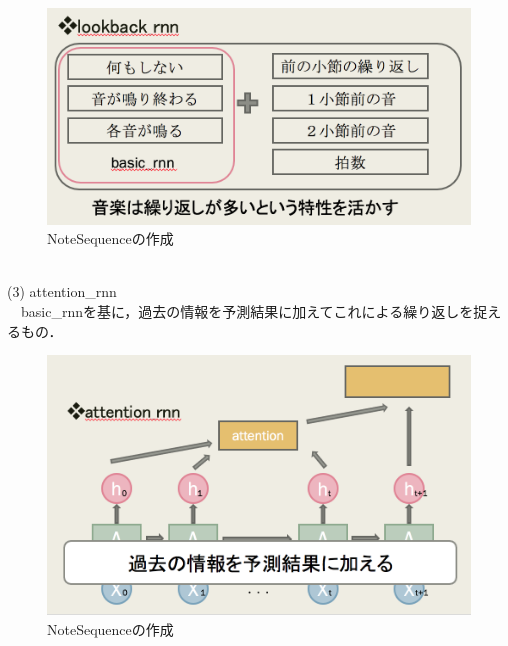 \begin{figure}[!ht]
    \begin{screen}
    \begin{center}
        \includegraphics[scale=0.8, clip]{./img/lookback1.png}
        \caption{NoteSequenceの作成}
        \label{fig:NoteSequenceの作成}
    \end{center}
    \end{screen}
\end{figure} \\
(3) attention\_rnn\\
　basic\_rnnを基に，過去の情報を予測結果に加えてこれによる繰り返しを捉えるもの．\\
\begin{figure}[!ht]
    \begin{screen}
    \begin{center}
        \includegraphics[scale=0.8, clip]{./img/attention1.png}
        \caption{NoteSequenceの作成}
        \label{fig:NoteSequenceの作成}
    \end{center}
    \end{screen}
\end{figure} \\
